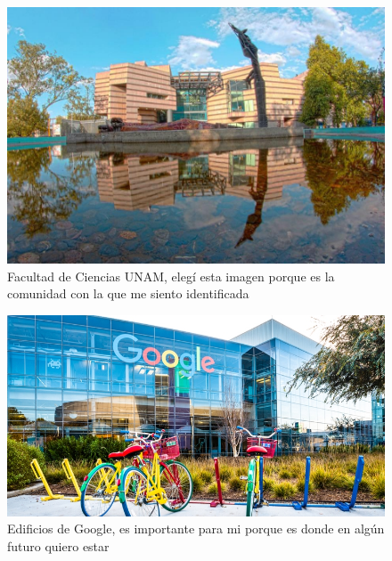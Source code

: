 \begin{figure}[h]
  \includegraphics[scale=0.2]{319316717/Practica1.jpg}
  \centering
  \caption{Facultad de Ciencias UNAM, elegí esta imagen porque es la comunidad con la que me siento identificada}
\end {figure}

\begin{figure}[h]
  \includegraphics[scale=1.25]{319316717/Practica1a.jpg}
  \centering
  \caption{Edificios de Google, es importante para mi porque es donde en algún futuro quiero estar}
\end {figure}

